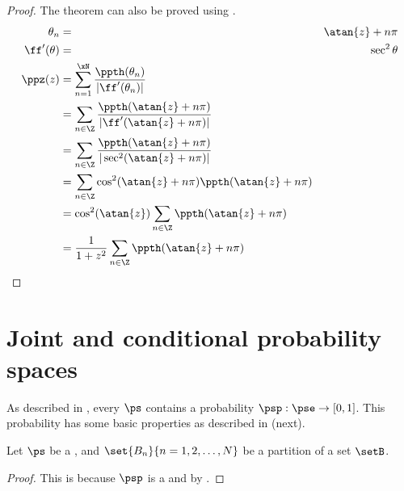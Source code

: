 \begin{proof}
The theorem can also be proved using .
\begin{align*}
  \theta_n &=& \atan{z}+n\pi \\
  \ff'(\theta) &=& \sec^2 \theta    \\
  \ppz(z)
    &= \sum_{n=1}^{\xN} \frac{\ppth(\theta_n)}{|\ff'(\theta_n)|}
  \\&= \sum_{n\in\Z}\frac{\ppth(\atan{z}+n\pi)}{|\ff'(\atan{z}+n\pi)|}
  \\&= \sum_{n\in\Z}\frac{\ppth(\atan{z}+n\pi)}{|\sec^2(\atan{z}+n\pi)|}
  \\&= \sum_{n\in\Z}\cos^2(\atan{z}+n\pi)  \ppth(\atan{z}+n\pi)
  \\&= \cos^2(\atan{z}) \sum_{n\in\Z} \ppth(\atan{z}+n\pi)
  \\&= \frac{1}{1+z^2}  \sum_{n\in\Z}\ppth(\atan{z}+n\pi)
\end{align*}
\end{proof}

\section{Joint and conditional probability spaces}
As described in ,
every  $\ps$ contains a probability  $\psp:\pse\to[0,1]$.
This probability  has some basic properties as described in
 (next).
\begin{theorem}
\label{thm:P}
Let $\ps$ be a ,
and $\set{B_n}{n=1,2,\ldots,N}$ be a partition of a set $\setB$.
\end{theorem}
\begin{proof}
This is because $\psp$ is a  and by .
\end{proof}



